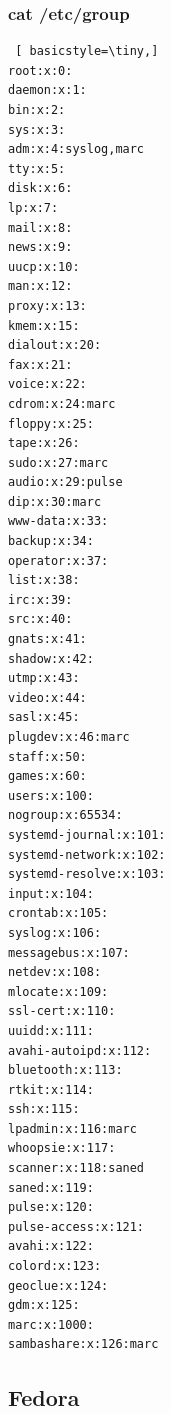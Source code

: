 \documentclass[preprint,11pt]{elsarticle}
\begin{document}
\subsubsection{cat /etc/group}
\begin{lstlisting} [ basicstyle=\tiny,]
root:x:0:
daemon:x:1:
bin:x:2:
sys:x:3:
adm:x:4:syslog,marc
tty:x:5:
disk:x:6:
lp:x:7:
mail:x:8:
news:x:9:
uucp:x:10:
man:x:12:
proxy:x:13:
kmem:x:15:
dialout:x:20:
fax:x:21:
voice:x:22:
cdrom:x:24:marc
floppy:x:25:
tape:x:26:
sudo:x:27:marc
audio:x:29:pulse
dip:x:30:marc
www-data:x:33:
backup:x:34:
operator:x:37:
list:x:38:
irc:x:39:
src:x:40:
gnats:x:41:
shadow:x:42:
utmp:x:43:
video:x:44:
sasl:x:45:
plugdev:x:46:marc
staff:x:50:
games:x:60:
users:x:100:
nogroup:x:65534:
systemd-journal:x:101:
systemd-network:x:102:
systemd-resolve:x:103:
input:x:104:
crontab:x:105:
syslog:x:106:
messagebus:x:107:
netdev:x:108:
mlocate:x:109:
ssl-cert:x:110:
uuidd:x:111:
avahi-autoipd:x:112:
bluetooth:x:113:
rtkit:x:114:
ssh:x:115:
lpadmin:x:116:marc
whoopsie:x:117:
scanner:x:118:saned
saned:x:119:
pulse:x:120:
pulse-access:x:121:
avahi:x:122:
colord:x:123:
geoclue:x:124:
gdm:x:125:
marc:x:1000:
sambashare:x:126:marc
\end{lstlisting}

\clearpage
\subsection{Fedora}
\end{document}
